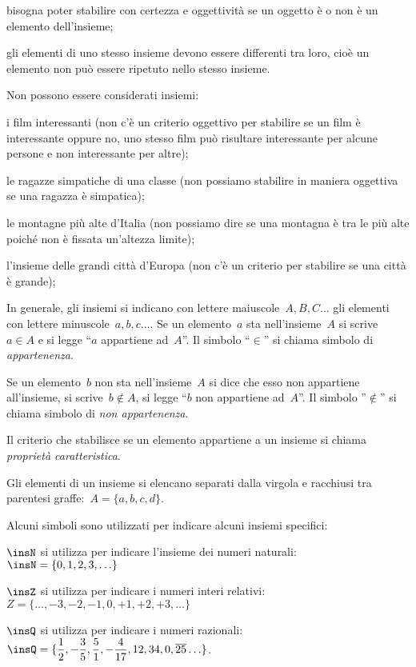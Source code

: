 \begin{itemize*}
\item bisogna poter stabilire con certezza e oggettività se un oggetto
è o non è un elemento dell'insieme;
\item gli elementi di uno stesso insieme devono essere differenti tra
loro, cioè un elemento non può essere ripetuto nello stesso insieme.
\end{itemize*}

Non possono essere considerati insiemi:
\begin{itemize*}
 \item i film interessanti (non c'è un criterio oggettivo per stabilire se 
un 
 film è interessante oppure no, uno stesso film
 può risultare interessante per alcune persone e non interessante per 
altre);
 \item le ragazze simpatiche di una classe (non possiamo stabilire in 
maniera 
 oggettiva se una ragazza è simpatica);
 \item le montagne più alte d'Italia (non possiamo dire se una montagna è 
tra 
 le più alte poiché non è fissata un'altezza limite);
 \item l'insieme delle grandi città d'Europa (non c'è un criterio per
stabilire se una città è grande);
\end{itemize*}


In generale, gli insiemi si indicano con lettere maiuscole~\(A, B, C\ldots\)
gli elementi con lettere minuscole~\(a, b, c\ldots\).
Se un elemento~\(a\) sta nell'insieme~\(A\) si scrive~\(a\in A\) e si legge 
``\(a\) appartiene ad~\(A\)''.
Il simbolo ``\(\in\)'' si chiama simbolo di \textit{appartenenza}.

Se un elemento~\(b\) non sta nell'insieme~\(A\) si dice
che esso non appartiene all'insieme, si scrive~\(b\notin A\),
si legge ``\(b\) non appartiene ad~\(A\)''. Il simbolo ''\(\notin\)''
si chiama simbolo di \textit{non appartenenza}.

Il criterio che stabilisce se un elemento appartiene a un insieme si chiama 
\textit{proprietà caratteristica}.

Gli elementi di un insieme si elencano separati dalla virgola e racchiusi 
tra parentesi graffe:~\(A=\{a,b,c,d\}\).

Alcuni simboli sono utilizzati per indicare alcuni insiemi specifici:
\begin{itemize*}
 \item \(\insN\) si utilizza per indicare l'insieme dei numeri 
  naturali:~\(\insN=\{0,1,2,3,\ldots\}\)
 \item \(\insZ\) si utilizza per indicare i numeri interi 
  relativi:~\(Z=\{\ldots,-3,-2,-1,0,+1,+2,+3,\ldots\}\)
 \item \(\insQ\) si utilizza per indicare i numeri 
 razionali:~\(\insQ=\{\dfrac{1}{2},-\dfrac{3}{5},\dfrac{5}{1},-
             \dfrac{4}{17},12,34,0,\overline{{25}}\ldots\}\).
 \end{itemize*}

